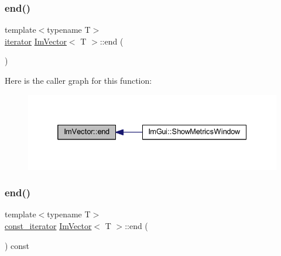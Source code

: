\subsubsection{\texorpdfstring{end()}{end()}\hspace{0.1cm}{\footnotesize\ttfamily [1/2]}}
{\footnotesize\ttfamily template$<$typename T$>$ \\
\mbox{\hyperlink{class_im_vector_a74b5478f1f6fd471cc71219bce483db6}{iterator}} \mbox{\hyperlink{class_im_vector}{Im\+Vector}}$<$ T $>$\+::end (\begin{DoxyParamCaption}{ }\end{DoxyParamCaption})\hspace{0.3cm}{\ttfamily [inline]}}

Here is the caller graph for this function\+:
\nopagebreak
\begin{figure}[H]
\begin{center}
\leavevmode
\includegraphics[width=332pt]{class_im_vector_a947fbc3b1d8c1997e51ae6caab440379_icgraph}
\end{center}
\end{figure}
\mbox{\label{class_im_vector_a06efa87357864d1c130f0f400eeccf8d}} 
\subsubsection{\texorpdfstring{end()}{end()}\hspace{0.1cm}{\footnotesize\ttfamily [2/2]}}
{\footnotesize\ttfamily template$<$typename T$>$ \\
\mbox{\hyperlink{class_im_vector_aedeac9c5080f9d6ce96ae837768ee4c4}{const\+\_\+iterator}} \mbox{\hyperlink{class_im_vector}{Im\+Vector}}$<$ T $>$\+::end (\begin{DoxyParamCaption}{ }\end{DoxyParamCaption}) const\hspace{0.3cm}{\ttfamily [inline]}}

\mbox{\label{class_im_vector_a1e1fd9b678be9d4b4432fbefde976045}} 
